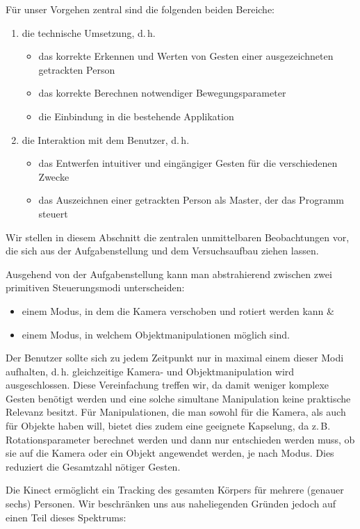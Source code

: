 	Für unser Vorgehen zentral sind die folgenden beiden Bereiche:
	\begin{enumerate}
		\item die technische Umsetzung, d.\,h.
		\begin{itemize}
		\item das korrekte Erkennen und Werten von Gesten einer ausgezeichneten getrackten Person
		\item das korrekte Berechnen notwendiger Bewegungsparameter
		\item die Einbindung in die bestehende Applikation
		\end{itemize}
		\item die Interaktion mit dem Benutzer, d.\,h.
		\begin{itemize}
		\item das Entwerfen intuitiver und eingängiger Gesten für die verschiedenen Zwecke
		\item das Auszeichnen einer getrackten Person als \glqq Master\grqq, der das Programm steuert
		\end{itemize}
	\end{enumerate}
	Wir stellen in diesem Abschnitt die zentralen unmittelbaren Beobachtungen vor, die sich aus der Aufgabenstellung und dem Versuchsaufbau ziehen lassen.\par\bigskip
	Ausgehend von der Aufgabenstellung kann man abstrahierend zwischen zwei primitiven Steuerungsmodi unterscheiden:
	\begin{itemize}
	\item einem Modus, in dem die Kamera verschoben und rotiert werden kann \&
	\item einem Modus, in welchem Objektmanipulationen möglich sind.
	\end{itemize}
	Der Benutzer sollte sich zu jedem Zeitpunkt nur in maximal einem dieser Modi aufhalten, d.\,h. gleichzeitige Kamera- und Objektmanipulation wird ausgeschlossen. Diese Vereinfachung treffen wir, da damit weniger komplexe Gesten benötigt werden und eine solche simultane Manipulation keine praktische Relevanz besitzt. Für Manipulationen, die man sowohl für die Kamera, als auch für Objekte haben will, bietet dies zudem eine geeignete Kapselung, da z.\,B. Rotationsparameter berechnet werden und dann nur entschieden werden muss, ob sie auf die Kamera oder ein Objekt angewendet werden, je nach Modus. Dies reduziert die Gesamtzahl nötiger Gesten.\par\medskip
	Die Kinect ermöglicht ein Tracking des gesamten Körpers für mehrere (genauer sechs) Personen. Wir beschränken uns aus naheliegenden Gründen jedoch auf einen Teil dieses Spektrums:

